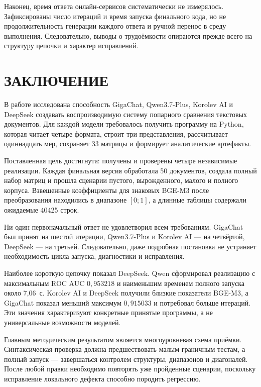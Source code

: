 \documentclass[a4paper,12pt]{extreport}
\begin{document}
Наконец, время ответа онлайн-сервисов систематически не измерялось. Зафиксированы число итераций и время запуска финального кода, но не продолжительность генерации каждого ответа и ручной перенос в среду выполнения. Следовательно, выводы о трудоёмкости опираются прежде всего на структуру цепочки и характер исправлений.

\clearpage
\chapter*{ЗАКЛЮЧЕНИЕ}

В работе исследована способность GigaChat, Qwen3.7-Plus, Korolev AI и DeepSeek создавать воспроизводимую систему попарного сравнения текстовых документов. Для каждой модели требовалось получить программу на Python, которая читает четыре формата, строит три представления, рассчитывает одиннадцать мер, сохраняет 33 матрицы и формирует аналитические артефакты.

Поставленная цель достигнута: получены и проверены четыре независимые реализации. Каждая финальная версия обработала 50 документов, создала полный набор матриц и прошла сценарии пустого, вырожденного, малого и полного корпуса. Взвешенные коэффициенты для знаковых BGE-M3 после преобразования находились в диапазоне $[0;1]$, а длинные таблицы содержали ожидаемые 40425 строк.

Ни один первоначальный ответ не удовлетворил всем требованиям. GigaChat был принят на шестой итерации, Qwen3.7-Plus и Korolev AI --- на четвёртой, DeepSeek --- на третьей. Следовательно, даже подробная постановка не устраняет необходимость цикла запуска, диагностики и исправления.

Наиболее короткую цепочку показал DeepSeek. Qwen сформировал реализацию с максимальным ROC AUC $0{,}953218$ и наименьшим временем полного запуска около 7,06~с. Korolev AI и DeepSeek получили близкие показатели BGE-M3, а GigaChat показал меньший максимум $0{,}915033$ и потребовал больше итераций. Эти значения характеризуют конкретные принятые программы, а не универсальные возможности моделей.

Главным методическим результатом является многоуровневая схема приёмки. Синтаксическая проверка должна предшествовать малым граничным тестам, а полный запуск --- завершаться контролем структуры, диапазонов и диагоналей. После любой правки необходимо повторять уже пройденные сценарии, поскольку исправление локального дефекта способно породить регрессию.
\end{document}

